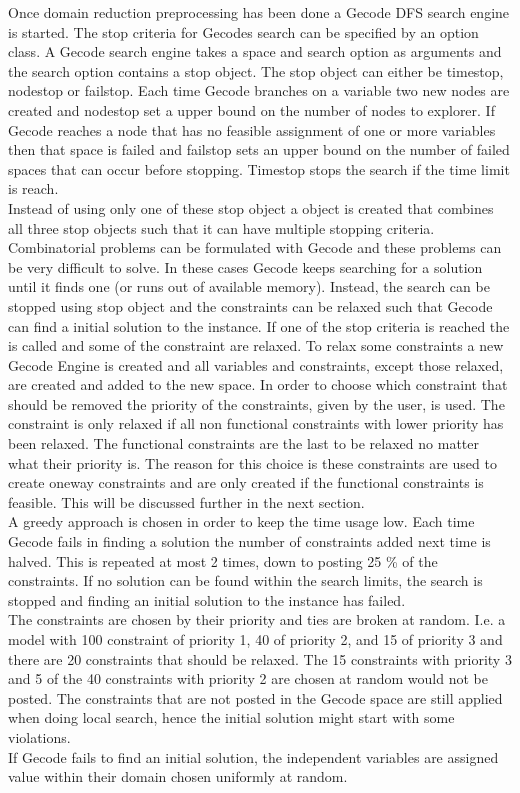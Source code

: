 Once domain reduction preprocessing has been done a Gecode DFS search engine is started. The stop criteria for Gecodes 
search can be specified by an option class. A Gecode search engine takes a space and search option 
as arguments and the search option contains a stop object. The stop object can either be timestop, nodestop or 
failstop. Each time Gecode branches on a variable two new nodes are created and nodestop set a upper bound on the 
number of nodes to explorer. If Gecode reaches a node that has no feasible assignment of one or more variables then 
that space is failed and failstop sets an upper bound on the number of failed spaces that can occur before stopping. 
Timestop stops the search if the time limit is reach. \\ 
Instead of using only one of these stop object a  object is created that combines all three 
stop objects such that it can have multiple stopping criteria. \\ 
Combinatorial problems can be formulated with Gecode and these problems can be very difficult to solve. In these cases 
Gecode keeps searching for a solution until it finds one (or runs out of available memory). Instead, the search can be 
stopped using stop object and the constraints can be relaxed such that Gecode can find a initial solution to the 
instance. If one of the stop criteria is reached the  is called and some of the constraint are relaxed. To 
relax some constraints a new Gecode Engine is created and all variables and constraints, except those relaxed, 
are created and added to the new space. In order to choose which constraint that should be removed the priority of the 
constraints, given by the user, is used. The constraint is only relaxed if all non functional constraints with lower 
priority has been relaxed. The functional constraints are the last to be relaxed no matter what their priority is. The 
reason for this choice is these constraints are used to create oneway constraints and are only created if the 
functional constraints is feasible. This will be discussed further in the next section.  \\ 
A greedy approach is chosen in order to keep the time usage low. Each time Gecode fails in finding a solution the number 
of constraints added next time is halved. This is repeated at most 2 times, down to posting 25 \% of the constraints. If 
no solution can be found within the search 
limits, the search is stopped and finding an initial solution to the instance has failed.  \\ 
The constraints are chosen by their priority and ties are broken at random. I.e. a model with 100 constraint of 
priority 1, 40 of priority 2, and 15 of priority 3 and there are 20 constraints that should be relaxed. The 15 
constraints with priority 3 and 5 of the 40 constraints with priority 2 are chosen at random would not be posted. The 
constraints that are not posted in the Gecode space are still applied when doing local search, hence the initial 
solution might start with some violations.  \\
If Gecode fails to find an initial solution, the independent variables are assigned value within their domain chosen 
uniformly at random. 